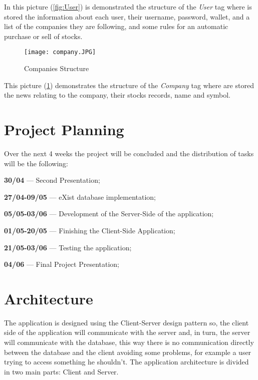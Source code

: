 \documentclass[twocolumn,twoside,11pt,a4paper]{article}
\begin{document}
In this picture (\ref{fig:User}) is demonstrated the structure of the \textit{User} tag where is
stored the information about each user, their username, password, wallet, and a list of the
companies they are following, and some rules for an automatic purchase or sell of stocks.

\begin{figure}[ht!]
\centering
\texttt{[image: company.JPG]}
\caption{Companies Structure}
\label{fig:Company}
\end{figure}

This picture (\ref{fig:Company}) demonstrates the structure of the \textit{Company} tag where are stored the news relating to the company, their stocks records, name and symbol.


\section{Project Planning}

Over the next 4 weeks the project will be concluded and the distribution of tasks will be the following:


\begin{compactitem}
\item \textbf{30/04} --- Second Presentation;
\item \textbf{27/04-09/05} --- eXist database implementation;
\item \textbf{05/05-03/06} --- Development of the Server-Side of the application;
\item \textbf{01/05-20/05} --- Finishing the Client-Side Application;
\item \textbf{21/05-03/06} --- Testing the application;
\item \textbf{04/06} --- Final Project Presentation;
\end{compactitem}


\section{Architecture}\label{sec:architecture}

The application is designed using the Client-Server design pattern so, the client side of the application will communicate with the server and, in turn, the server will communicate with the database, this way there is no communication directly between the database and the client avoiding some problems, for example a user trying to access something he shouldn't.
The application architecture is divided in two main parts: Client and Server. 
\end{document}
